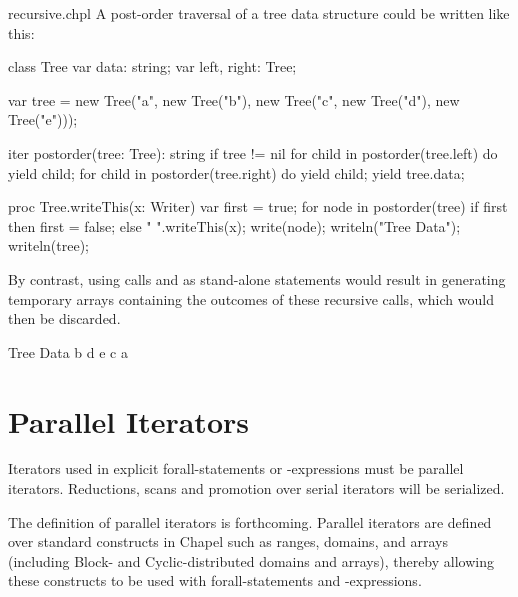 \begin{chapelexample}{recursive.chpl}
A post-order traversal of a tree data structure could be written like this:
\begin{chapelnoprint}
class Tree {
  var data: string;
  var left, right: Tree;
}

var tree = new Tree("a", new Tree("b"), new Tree("c", new Tree("d"), new Tree("e")));
\end{chapelnoprint}
\begin{chapel}
iter postorder(tree: Tree): string {
  if tree != nil {
    for child in postorder(tree.left) do
      yield child;
    for child in postorder(tree.right) do
      yield child;
    yield tree.data;
  }
}
\end{chapel}
\begin{chapelnoprint}
proc Tree.writeThis(x: Writer)
{
  var first = true;
  for node in postorder(tree) {
    if first then first = false;
      else " ".writeThis(x);
    write(node);
  }
}
writeln("Tree Data");
writeln(tree);
\end{chapelnoprint}
By contrast, using calls 
and  as stand-alone statements would
result in generating temporary arrays containing the outcomes of these
recursive calls, which would then be discarded.
\begin{chapeloutput}
Tree Data
b d e c a
\end{chapeloutput}
\end{chapelexample}

\section{Parallel Iterators}
\label{Parallel_Iterators}

Iterators used in explicit forall-statements or -expressions must be
parallel iterators.  Reductions, scans and promotion over serial
iterators will be serialized.

The definition of parallel iterators is forthcoming.  Parallel
iterators are defined over standard constructs in Chapel such as
ranges, domains, and arrays (including Block- and Cyclic-distributed
domains and arrays), thereby allowing these constructs to be used with
forall-statements and -expressions.
